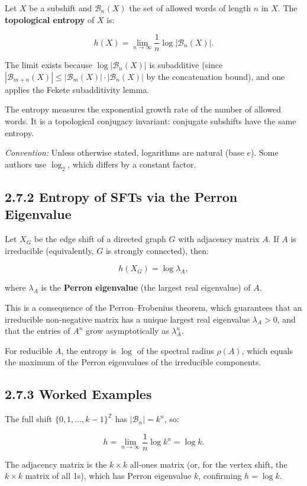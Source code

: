 \begin{definition}
Let $X$ be a subshift and $\mathcal{B}_n(X)$ the set of allowed words of length $n$ in $X$. The \textbf{topological entropy} of $X$ is:

\[
h(X) = \lim_{n \to \infty} \frac{1}{n} \log |\mathcal{B}_n(X)|.
\]

The limit exists because $\log |\mathcal{B}_n(X)|$ is subadditive (since $|\mathcal{B}_{m+n}(X)| \leq |\mathcal{B}_m(X)| \cdot |\mathcal{B}_n(X)|$ by the concatenation bound), and one applies the Fekete subadditivity lemma.

The entropy measures the exponential growth rate of the number of allowed words. It is a topological conjugacy invariant: conjugate subshifts have the same entropy.

\textit{Convention:} Unless otherwise stated, logarithms are natural (base $e$). Some authors use $\log_2$, which differs by a constant factor.
\end{definition}

\subsection{2.7.2 Entropy of SFTs via the Perron Eigenvalue}

\begin{theorem}
Let $X_G$ be the edge shift of a directed graph $G$ with adjacency matrix $A$. If $A$ is irreducible (equivalently, $G$ is strongly connected), then:

\[
h(X_G) = \log \lambda_A,
\]

where $\lambda_A$ is the \textbf{Perron eigenvalue} (the largest real eigenvalue) of $A$.

This is a consequence of the Perron--Frobenius theorem, which guarantees that an irreducible non-negative matrix has a unique largest real eigenvalue $\lambda_A > 0$, and that the entries of $A^n$ grow asymptotically as $\lambda_A^n$.

For reducible $A$, the entropy is $\log$ of the spectral radius $\rho(A)$, which equals the maximum of the Perron eigenvalues of the irreducible components.
\end{theorem}

\subsection{2.7.3 Worked Examples}

\begin{example}
The full shift $\{ 0, 1, \ldots, k-1\} ^{\mathbb{Z}}$ has $|\mathcal{B}_n| = k^n$, so:

\[
h = \lim_{n \to \infty} \frac{1}{n} \log k^n = \log k.
\]

The adjacency matrix is the $k \times k$ all-ones matrix (or, for the vertex shift, the $k \times k$ matrix of all 1s), which has Perron eigenvalue $k$, confirming $h = \log k$.
\end{example}

